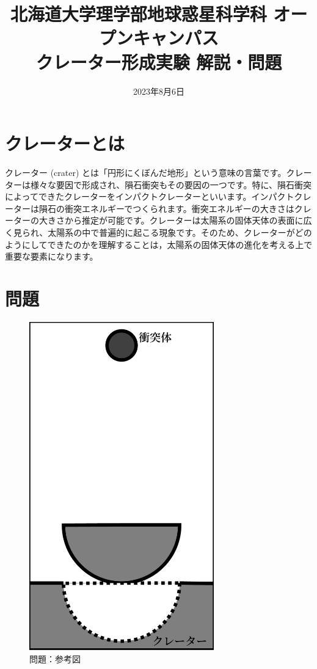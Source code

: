 \documentclass[a4paper]{ltjsarticle}
\begin{document}
\title{北海道大学理学部地球惑星科学科 オープンキャンパス\\クレーター形成実験 解説・問題}
\date{2023年8月6日}
\maketitle
\thispagestyle{empty}

\section{クレーターとは}
クレーター (crater) とは「円形にくぼんだ地形」という意味の言葉です。クレーターは様々な要因で形成され、隕石衝突もその要因の一つです。特に、隕石衝突によってできたクレーターをインパクトクレーターといいます。インパクトクレーターは隕石の衝突エネルギーでつくられます。衝突エネルギーの大きさはクレーターの大きさから推定が可能です。クレーターは太陽系の固体天体の表面に広く見られ、太陽系の中で普遍的に起こる現象です。そのため、クレーターがどのようにしてできたのかを理解することは，太陽系の固体天体の進化を考える上で重要な要素になります。

\section{問題}
\begin{figure}
    \vspace{-6mm}
    \includegraphics[width=80mm,clip]{./figure/explanation_figure.pdf}
    \vspace{-6mm}
    \caption{問題：参考図}
\end{figure}
\end{document}
